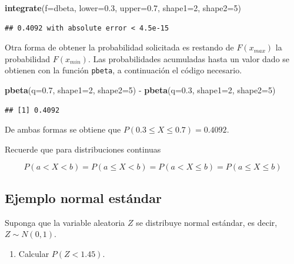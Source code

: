 \documentclass[10pt,]{krantz}
\makeatletter
\newenvironment{Shaded}{\begin{snugshade}}{\end{snugshade}}
\newcommand{\KeywordTok}[1]{\textcolor[rgb]{0.13,0.29,0.53}{\textbf{{#1}}}}
\newcommand{\DataTypeTok}[1]{\textcolor[rgb]{0.13,0.29,0.53}{{#1}}}
\newcommand{\DecValTok}[1]{\textcolor[rgb]{0.00,0.00,0.81}{{#1}}}
\newcommand{\FloatTok}[1]{\textcolor[rgb]{0.00,0.00,0.81}{{#1}}}
\newcommand{\StringTok}[1]{\textcolor[rgb]{0.31,0.60,0.02}{{#1}}}
\newcommand{\NormalTok}[1]{{#1}}
\providecommand{\tightlist}{%
  \setlength{\itemsep}{0pt}\setlength{\parskip}{0pt}}
\newenvironment{kframe}{%
\medskip{}
\setlength{\fboxsep}{.8em}
 \def\at@end@of@kframe{}%
 \ifinner\ifhmode%
  \def\at@end@of@kframe{\end{minipage}}%
  \begin{minipage}{\columnwidth}%
 \fi\fi%
 \def\FrameCommand##1{\hskip\@totalleftmargin \hskip-\fboxsep
 \colorbox{shadecolor}{##1}\hskip-\fboxsep
     \hskip-\linewidth \hskip-\@totalleftmargin \hskip\columnwidth}%
 \MakeFramed {\advance\hsize-\width
   \@totalleftmargin\z@ \linewidth\hsize
   \@setminipage}}%
 {\par\unskip\endMakeFramed%
 \at@end@of@kframe}
\renewenvironment{Shaded}{\begin{kframe}}{\end{kframe}}
\let\BeginKnitrBlock\begin \let\EndKnitrBlock\end
\makeatother
\begin{document}
\begin{Shaded}
\begin{Highlighting}[]
\KeywordTok{integrate}\NormalTok{(}\DataTypeTok{f=}\NormalTok{dbeta, }\DataTypeTok{lower=}\FloatTok{0.3}\NormalTok{, }\DataTypeTok{upper=}\FloatTok{0.7}\NormalTok{,}
          \DataTypeTok{shape1=}\DecValTok{2}\NormalTok{, }\DataTypeTok{shape2=}\DecValTok{5}\NormalTok{)}
\end{Highlighting}
\end{Shaded}

\begin{verbatim}
## 0.4092 with absolute error < 4.5e-15
\end{verbatim}

Otra forma de obtener la probabilidad solicitada es restando de
\(F(x_{max})\) la probabilidad \(F(x_{min})\). Las probabilidades
acumuladas hasta un valor dado se obtienen con la función
\texttt{pbeta}, a continuación el código necesario.

\begin{Shaded}
\begin{Highlighting}[]
\KeywordTok{pbeta}\NormalTok{(}\DataTypeTok{q=}\FloatTok{0.7}\NormalTok{, }\DataTypeTok{shape1=}\DecValTok{2}\NormalTok{, }\DataTypeTok{shape2=}\DecValTok{5}\NormalTok{) -}\StringTok{ }\KeywordTok{pbeta}\NormalTok{(}\DataTypeTok{q=}\FloatTok{0.3}\NormalTok{, }\DataTypeTok{shape1=}\DecValTok{2}\NormalTok{, }\DataTypeTok{shape2=}\DecValTok{5}\NormalTok{)}
\end{Highlighting}
\end{Shaded}

\begin{verbatim}
## [1] 0.4092
\end{verbatim}

De ambas formas se obtiene que \(P(0.3 \leq X \leq 0.7)=0.4092\).

\BeginKnitrBlock{rmdnote}
Recuerde que para distribuciones continuas

\[ P(a < X < b) = P(a \leq X < b) = P(a < X \leq b) = P(a \leq X \leq b)\]
\EndKnitrBlock{rmdnote}

\subsection*{Ejemplo normal estándar}\label{ejemplo-normal-estandar}


Suponga que la variable aleatoria \(Z\) se distribuye normal estándar,
es decir, \(Z \sim N(0, 1)\).

\begin{enumerate}
\def\labelenumi{\arabic{enumi})}
\tightlist
\item
  Calcular \(P(Z < 1.45)\).
\end{enumerate}
\end{document}
